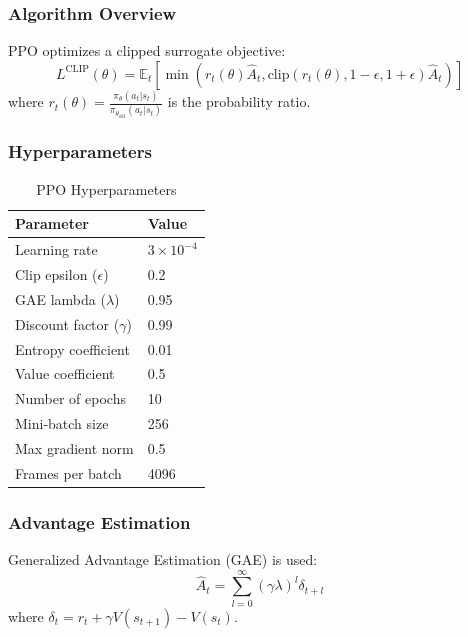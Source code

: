 \documentclass[11pt]{article}
\begin{document}
\subsubsection{Algorithm Overview}

PPO optimizes a clipped surrogate objective:
\begin{equation}
    L^{\text{CLIP}}(\theta) = \mathbb{E}_t \left[ \min\left( r_t(\theta) \hat{A}_t, \text{clip}(r_t(\theta), 1-\epsilon, 1+\epsilon) \hat{A}_t \right) \right]
\end{equation}
where $r_t(\theta) = \frac{\pi_\theta(a_t|s_t)}{\pi_{\theta_{\text{old}}}(a_t|s_t)}$ is the probability ratio.

\subsubsection{Hyperparameters}

\begin{table}[H]
\centering
\caption{PPO Hyperparameters}
\begin{tabular}{@{}ll@{}}
\toprule
\textbf{Parameter} & \textbf{Value} \\
\midrule
Learning rate & $3 \times 10^{-4}$ \\
Clip epsilon ($\epsilon$) & 0.2 \\
GAE lambda ($\lambda$) & 0.95 \\
Discount factor ($\gamma$) & 0.99 \\
Entropy coefficient & 0.01 \\
Value coefficient & 0.5 \\
Number of epochs & 10 \\
Mini-batch size & 256 \\
Max gradient norm & 0.5 \\
Frames per batch & 4096 \\
\bottomrule
\end{tabular}
\end{table}

\subsubsection{Advantage Estimation}

Generalized Advantage Estimation (GAE) is used:
\begin{equation}
    \hat{A}_t = \sum_{l=0}^{\infty} (\gamma \lambda)^l \delta_{t+l}
\end{equation}
where $\delta_t = r_t + \gamma V(s_{t+1}) - V(s_t)$.
\end{document}
